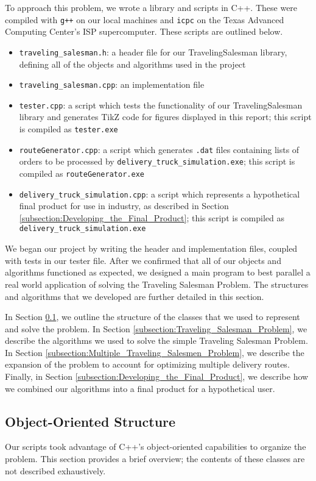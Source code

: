 \documentclass[letterpaper]{article}
\begin{document}
    To approach this problem, we wrote a library and scripts in C++. These were compiled with \verb|g++| on our local machines and \verb|icpc| on the Texas Advanced Computing Center's ISP supercomputer. These scripts are outlined below.
    \begin{itemize}
        \item \verb|traveling_salesman.h|: a header file for our TravelingSalesman library, defining all of the objects and algorithms used in the project
        \item \verb|traveling_salesman.cpp|: an implementation file
        \item \verb|tester.cpp|: a script which tests the functionality of our TravelingSalesman library and generates TikZ code for figures displayed in this report; this script is compiled as \verb|tester.exe|
        \item \verb|routeGenerator.cpp|: a script which generates \verb|.dat| files containing lists of orders to be processed by \verb|delivery_truck_simulation.exe|; this script is compiled as \verb|routeGenerator.exe|
        \item \verb|delivery_truck_simulation.cpp|: a script which represents a hypothetical final product for use in industry, as described in Section \ref{subsection:Developing_the_Final_Product}; this script is compiled as \verb|delivery_truck_simulation.exe|
    \end{itemize}

    We began our project by writing the header and implementation files, coupled with tests in our tester file. After we confirmed that all of our objects and algorithms functioned as expected, we designed a main program to best parallel a real world application of solving the Traveling Salesman Problem. The structures and algorithms that we developed are further detailed in this section.

    In Section \ref{subsection:Object-Oriented_Structure}, we outline the structure of the classes that we used to represent and solve the problem. In Section \ref{subsection:Traveling_Salesman_Problem}, we describe the algorithms we used to solve the simple Traveling Salesman Problem. In Section \ref{subsection:Multiple_Traveling_Salesmen_Problem}, we describe the expansion of the problem to account for optimizing multiple delivery routes. Finally, in Section \ref{subsection:Developing_the_Final_Product}, we describe how we combined our algorithms into a final product for a hypothetical user.

    \subsection{Object-Oriented Structure}
    \label{subsection:Object-Oriented_Structure}
    Our scripts took advantage of C++'s object-oriented capabilities to organize the problem. This section provides a brief overview; the contents of these classes are not described exhaustively.
    
\end{document}
